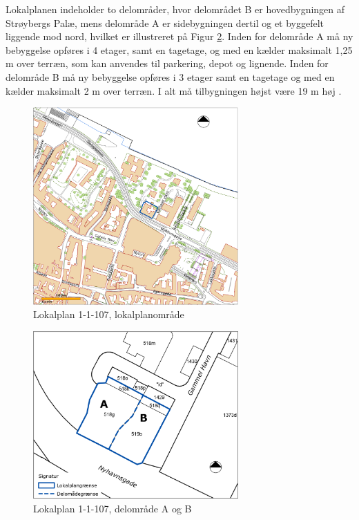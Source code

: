 \newline \indent{     }  Lokalplanen indeholder to delområder, hvor delområdet B er hovedbygningen af Strøybergs Palæ, mens delområde A er sidebygningen dertil og et byggefelt liggende mod nord, hvilket er illustreret på Figur \ref{fig:aogb}. Inden for delområde A må ny bebyggelse opføres i 4 etager, samt en tagetage, og med en kælder maksimalt 1,25 m over terræn, som kan anvendes til parkering, depot og lignende. Inden for delområde B må ny bebyggelse opføres i 3 etager samt en tagetage og med en kælder maksimalt 2 m over terræn. I alt må tilbygningen højst være 19 m høj \citep[ s. 7 og 16]{lokalplan}.

\begin{figure}[htbp]
	\centering
	\includegraphics[width=0.7\textwidth]{billeder/nylokalplanoversigt.png}
	\caption{Lokalplan 1-1-107, lokalplanområde \citep[ s. 40]{lokalplan}}
	\label{fig:1-1-107}
\end{figure}

\begin{figure}[htbp]
	\centering
	\includegraphics[width=0.7\textwidth]{billeder/tilbygning.png}
	\caption{Lokalplan 1-1-107, delområde A og B \citep[ bilag 1, s. 33]{lokalplan}}
	\label{fig:aogb}
\end{figure}

